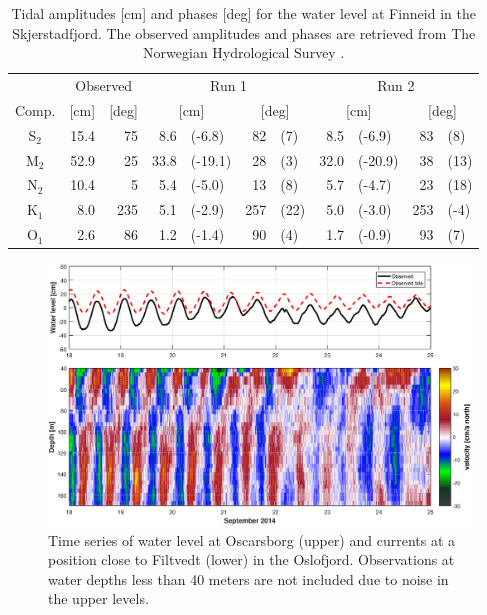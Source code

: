 \begin{table}[ht]
\caption{Tidal amplitudes [cm] and phases [deg] for the water level at Finneid in the Skjerstadfjord. The observed amplitudes and phases are retrieved from The Norwegian Hydrological Survey \cite[]{tide16}.}
\label{tab:Finneid}
\centering
\begin{tabular}{crrr@{ }lr@{ }lr@{ }lr@{ }l} \hline
      & \multicolumn{2}{c}{Observed} & \multicolumn{4}{c}{Run 1} & \multicolumn{4}{c}{Run 2}  \\
Comp. & [cm] & [deg] & \multicolumn{2}{c}{[cm]} & \multicolumn{2}{c}{[deg]} & \multicolumn{2}{c}{[cm]} & \multicolumn{2}{c}{[deg]}  \\ \hline 
S$_2$  & 15.4 &  75  &  8.6  & 	(-6.8) &  82  & (7)  &  8.5 & (-6.9)  &  83 & (8)  \\
M$_2$  & 52.9 &  25  & 33.8  & (-19.1) &  28  & (3)  & 32.0 & (-20.9) &  38 & (13) \\
N$_2$  & 10.4 &   5  &  5.4  &  (-5.0) &  13  & (8)  &  5.7 & (-4.7)  &  23 & (18) \\
K$_1$  &  8.0 & 235  &  5.1  &  (-2.9) & 257  & (22) &  5.0 & (-3.0)  & 253 & (-4) \\
O$_1$  &  2.6 &  86  &  1.2  &  (-1.4) &  90  & (4)  &  1.7 & (-0.9)  &  93 & (7)  \\ \hline 
\end{tabular}
\end{table}

\begin{figure}[!t]
\centering
\includegraphics[width=\textwidth]{fig_Filtvedt_timeseries_obs}
\caption{Time series of water level at Oscarsborg (upper) and currents at a position close to Filtvedt (lower) in the Oslofjord. Observations at water depths less than 40 meters are not included due to noise in the upper levels.}
\label{fig:Filtvedt_timeseries_obs}
\end{figure}


